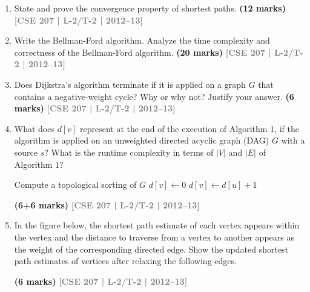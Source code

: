 \documentclass[12pt]{article}
\newcommand{\yr}[1]{\hfill\textcolor{gray}{\small\textbf{[#1]}}}
\newcommand{\mk}[1]{\textcolor{orange!70!black}{\small\textbf{(#1 marks)}}}
\begin{document}
\begin{enumerate}
\item State and prove the convergence property of shortest paths. \mk{12}
\yr{CSE 207 | L-2/T-2 | 2012--13}


\item Write the Bellman-Ford algorithm. Analyze the time complexity and correctness of the Bellman-Ford algorithm. \mk{20}
\yr{CSE 207 | L-2/T-2 | 2012--13}


\item Does Dijkstra's algorithm terminate if it is applied on a graph $G$ that contains a negative-weight cycle? Why or why not? Justify your answer. \mk{6}
\yr{CSE 207 | L-2/T-2 | 2012--13}


\item What does $d[v]$ represent at the end of the execution of Algorithm 1, if the algorithm is applied on an unweighted directed acyclic graph (DAG) $G$ with a source $s$? What is the runtime complexity in terms of $|V|$ and $|E|$ of Algorithm 1?
\begin{tcolorbox}[colback=white, colframe=cA!50, arc=3pt,
  title={\textbf{Algorithm: }\textsc{LongestPath-DAG}($G$)}]
\begin{algorithmic}[1]
\State Compute a topological sorting of $G$
    \State $d[v] \gets 0$
\EndFor
{}
            \State $d[v] \gets d[u] + 1$
        \EndIf
    \EndFor
\EndFor
\end{algorithmic}
\end{tcolorbox}

 \mk{6+6}
\yr{CSE 207 | L-2/T-2 | 2012--13}

 
\item In the figure below, the shortest path estimate of each vertex appears within the vertex and the distance to traverse from a vertex to another appears as the weight of the corresponding directed edge. Show the updated shortest path estimates of vertices after relaxing the following edges.

\begin{center}
\end{center}
\mk{6} \yr{CSE 207 | L-2/T-2 | 2012--13}



\end{enumerate}
\end{document}
